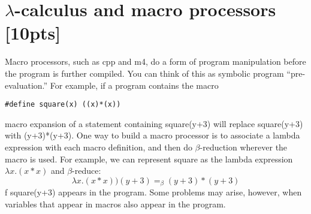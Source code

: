 \documentclass{article}
\begin{document}
\section {$\lambda$-calculus and macro processors [10pts]}
Macro processors, such as cpp and m4, do a form of program manipulation before
the program is further
compiled. You can think of this as symbolic program “pre-evaluation.” For
example, if a program contains
the macro
\begin{lstlisting}
#define square(x) ((x)*(x))
\end{lstlisting}
macro expansion of a statement containing square(y+3) will replace square(y+3) 
with (y+3)*(y+3). One way to build a macro processor is to associate a lambda 
expression with each macro definition, and then do $\beta$-reduction wherever 
the macro is used. For example, we can represent square as the lambda
expression $\lambda x.(x * x)$ and $\beta$-reduce:
$$\lambda x.(x*x))(y+3)=_\beta (y+3)*(y+3)$$
f square(y+3) appears in the program. Some problems may arise, however, when
variables that appear in
macros also appear in the program.
\end{document}

